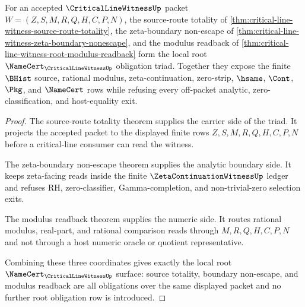 \begin{theorem}
\label{thm:critical-line-witness-namecert-obligation-triad}
For an accepted $\CriticalLineWitnessUp$ packet $W=(Z,S,M,R,Q,H,C,P,N)$, the
source-route totality of
\autoref{thm:critical-line-witness-source-route-totality}, the zeta-boundary
non-escape of \autoref{thm:critical-line-witness-zeta-boundary-nonescape}, and
the modulus readback of
\autoref{thm:critical-line-witness-root-modulus-readback} form the local root
$\NameCert_{\CriticalLineWitnessUp}$ obligation triad. Together they expose the
finite $\BHist$ source, rational modulus, zeta-continuation, zero-strip,
$\hsame$, $\Cont$, $\Pkg$, and $\NameCert$ rows while refusing every off-packet
analytic, zero-classification, and host-equality exit.
\end{theorem}
\begin{proof}
The source-route totality theorem supplies the carrier side of the triad. It
projects the accepted packet to the displayed finite rows
$Z,S,M,R,Q,H,C,P,N$ before a critical-line consumer can read the witness.

The zeta-boundary non-escape theorem supplies the analytic boundary side. It
keeps zeta-facing reads inside the finite $\ZetaContinuationWitnessUp$ ledger
and refuses RH, zero-classifier, Gamma-completion, and non-trivial-zero
selection exits.

The modulus readback theorem supplies the numeric side. It routes rational
modulus, real-part, and rational comparison reads through $M,R,Q,H,C,P,N$ and
not through a host numeric oracle or quotient representative.

Combining these three coordinates gives exactly the local root
$\NameCert_{\CriticalLineWitnessUp}$ surface: source totality, boundary
non-escape, and modulus readback are all obligations over the same displayed
packet and no further root obligation row is introduced.
\end{proof}

